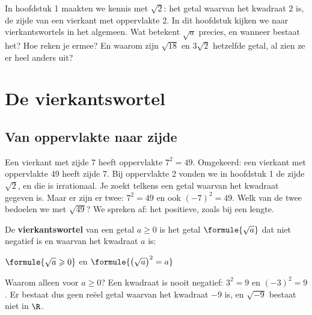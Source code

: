 In hoofdstuk 1 maakten we kennis met $\sqrt2$: het getal waarvan het kwadraat 2 is, de zijde van een vierkant met oppervlakte 2. In dit hoofdstuk kijken we naar vierkantswortels in het algemeen. Wat betekent $\sqrt{a}$ precies, en wanneer bestaat het? Hoe reken je ermee? En waarom zijn $\sqrt{18}$ en $3\sqrt2$ hetzelfde getal, al zien ze er heel anders uit?

\begin{oefeningen}[Start]

\end{oefeningen}

\section{De vierkantswortel}

\subsection{Van oppervlakte naar zijde}

Een vierkant met zijde 7 heeft oppervlakte $7^2 = 49$. Omgekeerd: een vierkant met oppervlakte 49 heeft zijde 7. Bij oppervlakte 2 vonden we in hoofdstuk 1 de zijde $\sqrt2$, en die is irrationaal. Je zoekt telkens een getal waarvan het kwadraat gegeven is. Maar er zijn er twee: $7^2 = 49$ en ook $(-7)^2 = 49$. Welk van de twee bedoelen we met $\sqrt{49}$? We spreken af: het positieve, zoals bij een lengte.

\begin{theorie}
De \textbf{\textcolor{accent}{vierkantswortel}} van een getal $a \geqslant 0$ is het getal $\formule{\sqrt a}$ dat niet negatief is en waarvan het kwadraat $a$ is:

\vspace{1mm}
\qquad $\formule{\sqrt a \geqslant 0}$ \qquad en \qquad $\formule{\bigl(\sqrt a\bigr)^2 = a}$
\end{theorie}

Waarom alleen voor $a \geqslant 0$? Een kwadraat is nooit negatief: $3^2 = 9$ en $(-3)^2 = 9$. Er bestaat dus geen reëel getal waarvan het kwadraat $-9$ is, en $\sqrt{-9}$ bestaat niet in $\R$.


